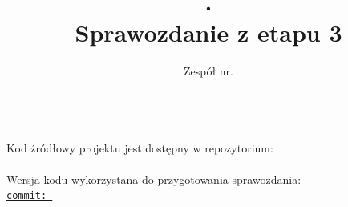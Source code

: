 \documentclass[12pt, a4paper]{article}
\title{\ProjectNumber. \ProjectTitle\\\large Sprawozdanie z etapu 3}
\author{Zespół nr. \TeamNumber \\ \AuthorOne \\ \AuthorTwo}
\date{}
\begin{document}
    \begin{titlepage}
       \maketitle

       \vfill

       \begin{center}
            \large
            Kod źródłowy projektu jest dostępny w repozytorium:\\[0.3cm]
            \href{\RepositoryURL}{\texttt{\RepositoryURL}}\\[0.6cm]

            Wersja kodu wykorzystana do przygotowania sprawozdania:\\[0.3cm]
            \href{\CommitURL}{\texttt{commit: \CommitHash}}
       \end{center}
    \end{titlepage}
    \clearpage

    \tableofcontents
    \clearpage

    \listoftables
    \clearpage

    \listoffigures
    \clearpage

    
    
    
    

    \clearpage
\end{document}
